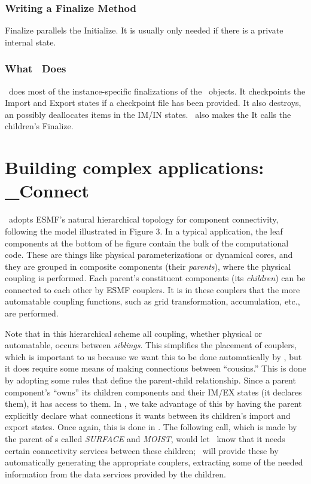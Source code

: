 \subsubsection{Writing a Finalize Method}

Finalize parallels the Initialize. It is usually only needed if there is a 
private internal state.

\subsubsection{What \gfin\  Does}

\gfin\  does most of the instance-specific finalizations of
the \ggn\  objects. It checkpoints the Import and Export states if
a checkpoint file has been provided. 
It also destroys, an possibly deallocates items in the IM/IN states.
 \gint\  also makes the
It calls the children's Finalize.

\section{Building complex applications: \ggn\_Connect}

\ggn\   adopts ESMF's natural hierarchical topology for
component connectivity, following the model illustrated in Figure 3. In
a typical application, the leaf components at the bottom of he figure
contain the bulk of the computational code. These are things like
physical parameterizations or dynamical cores, and they are grouped in
composite components (their {\em parents}), where the physical coupling
is performed. Each parent's constituent components (its {\em children})
can be connected to each other by ESMF couplers. It is in these
couplers that the more automatable coupling functions, such as grid
transformation, accumulation, etc., are performed.

Note that in this hierarchical scheme all coupling, whether physical
or automatable, occurs between {\em siblings}. This simplifies the
placement of couplers, which is important to us because we want this
to be done automatically by \ggn, but it does require some
means of making connections between ``cousins.'' This is done by
adopting some rules that define the parent-child relationship. Since a
parent component's ``owns'' its children components and their IM/EX
states (it declares them), it has access to them. In \ggn, we
take advantage of this by having the parent explicitly declare what
connections it wants between its children's import and export
states. Once again, this is done in \ssv. The following call,
which is made by the parent of \egc s called 
{\em SURFACE} and {\em MOIST}, would let \ggn\   know that it needs
certain connectivity services between these children; \ggn\  
will provide these by automatically generating the appropriate
couplers, extracting some of the needed information from the data
services provided by the children.

